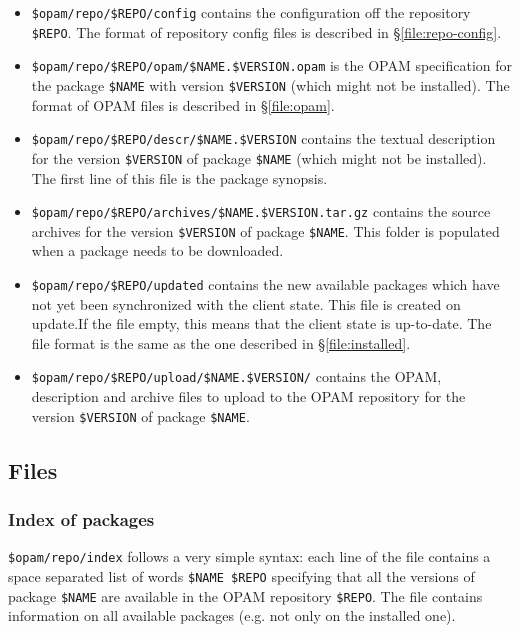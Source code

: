 \documentclass[a4paper,11pt]{article}
\begin{document}
\begin{itemize}

\item \verb+$opam/repo/$REPO/config+ contains the configuration
  off the repository \verb+$REPO+. The format of repository config
  files is described in \S\ref{file:repo-config}.

\item \verb+$opam/repo/$REPO/opam/$NAME.$VERSION.opam+ is the OPAM
  specification for the package \verb+$NAME+ with version
  \verb+$VERSION+ (which might not be installed). The format of OPAM
  files is described in \S\ref{file:opam}.

\item \verb+$opam/repo/$REPO/descr/$NAME.$VERSION+ contains the textual
  description for the version \verb+$VERSION+ of package \verb+$NAME+
  (which might not be installed). The first line of this file is the
  package synopsis.

\item \verb+$opam/repo/$REPO/archives/$NAME.$VERSION.tar.gz+ contains
  the source archives for the version \verb+$VERSION+ of package
  \verb+$NAME+. This folder is populated when a package needs to be
  downloaded.

\item \verb+$opam/repo/$REPO/updated+ contains the new available
  packages which have not yet been synchronized with the client
  state. This file is created on update.If the file empty, this means that the
  client state is up-to-date. The file format is the same as the one
  described in \S\ref{file:installed}.

\item \verb+$opam/repo/$REPO/upload/$NAME.$VERSION/+ contains the
  OPAM, description and archive files to upload to the OPAM repository
  for the version \verb+$VERSION+ of package \verb+$NAME+.

\end{itemize}

\subsection{Files}

\subsubsection{Index of packages}
\label{file:index}

\verb+$opam/repo/index+ follows a very simple syntax: each line of the
file contains a space separated list of words \verb+$NAME $REPO+
specifying that all the versions of package \verb+$NAME+ are available
in the OPAM repository \verb+$REPO+. The file contains information on
all available packages (e.g. not only on the installed one). \\
\end{document}
